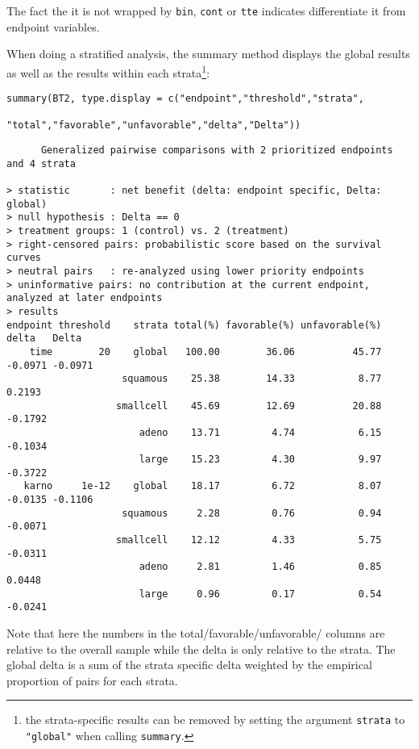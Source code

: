 \documentclass[12pt]{article}
\begin{document}
The fact the it is not wrapped by \texttt{bin}, \texttt{cont} or \texttt{tte} indicates
differentiate it from endpoint variables. 

\clearpage

When doing a stratified analysis, the summary method displays the
global results as well as the results within each strata\footnote{the
strata-specific results can be removed by setting the argument
\texttt{strata} to \texttt{"global"} when calling \texttt{summary}.}:
\lstset{language=r,label= ,caption= ,captionpos=b,numbers=none}
\begin{lstlisting}
summary(BT2, type.display = c("endpoint","threshold","strata",
							  "total","favorable","unfavorable","delta","Delta"))
\end{lstlisting}

\begin{verbatim}
      Generalized pairwise comparisons with 2 prioritized endpoints and 4 strata

> statistic       : net benefit (delta: endpoint specific, Delta: global) 
> null hypothesis : Delta == 0 
> treatment groups: 1 (control) vs. 2 (treatment) 
> right-censored pairs: probabilistic score based on the survival curves
> neutral pairs   : re-analyzed using lower priority endpoints
> uninformative pairs: no contribution at the current endpoint, analyzed at later endpoints
> results
endpoint threshold    strata total(%) favorable(%) unfavorable(%)   delta   Delta
    time        20    global   100.00        36.06          45.77 -0.0971 -0.0971
                    squamous    25.38        14.33           8.77  0.2193        
                   smallcell    45.69        12.69          20.88 -0.1792        
                       adeno    13.71         4.74           6.15 -0.1034        
                       large    15.23         4.30           9.97 -0.3722        
   karno     1e-12    global    18.17         6.72           8.07 -0.0135 -0.1106
                    squamous     2.28         0.76           0.94 -0.0071        
                   smallcell    12.12         4.33           5.75 -0.0311        
                       adeno     2.81         1.46           0.85  0.0448        
                       large     0.96         0.17           0.54 -0.0241
\end{verbatim}

Note that here the numbers in the total/favorable/unfavorable/ columns
are relative to the overall sample while the delta is only relative to
the strata. The global delta is a sum of the strata specific delta
weighted by the empirical proportion of pairs for each strata.
\end{document}
